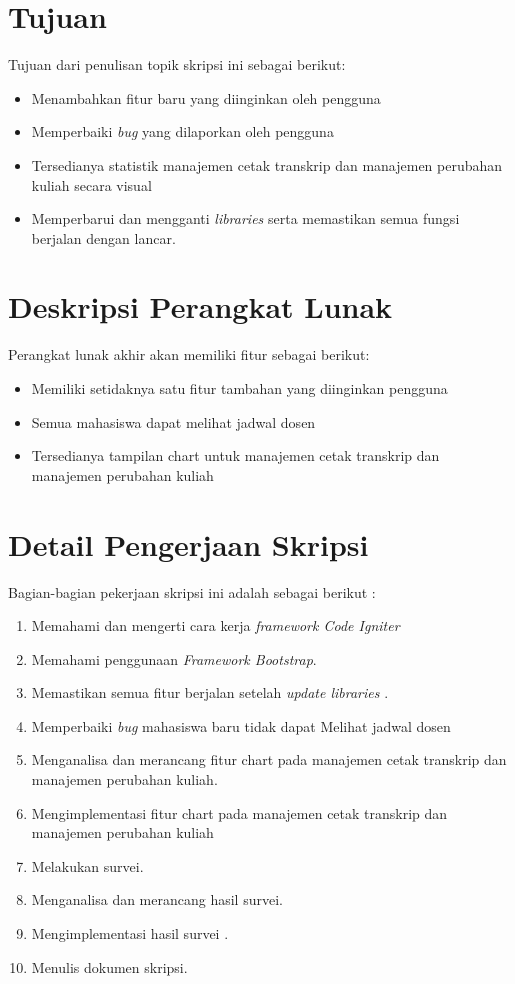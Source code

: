 \documentclass[a4paper,twoside]{article}
\begin{document}
\section{Tujuan}
Tujuan dari penulisan topik skripsi ini sebagai berikut:
\begin{itemize}
	\item Menambahkan fitur baru yang diinginkan oleh pengguna
	\item Memperbaiki \textit{bug} yang dilaporkan oleh pengguna
	\item Tersedianya statistik manajemen cetak transkrip dan manajemen perubahan kuliah secara visual
	\item Memperbarui dan mengganti \textit{libraries} serta memastikan semua fungsi berjalan dengan lancar.
\end{itemize}

\section{Deskripsi Perangkat Lunak}

Perangkat lunak akhir akan memiliki fitur sebagai berikut:
\begin{itemize}
	\item Memiliki setidaknya satu fitur tambahan yang diinginkan pengguna
	\item Semua mahasiswa dapat melihat jadwal dosen
	\item Tersedianya tampilan chart untuk manajemen cetak transkrip dan manajemen perubahan kuliah
	
\end{itemize}

\section{Detail Pengerjaan Skripsi}

Bagian-bagian pekerjaan skripsi ini adalah sebagai berikut :
	\begin{enumerate}
		\item Memahami dan mengerti cara kerja \textit{framework Code Igniter}
		\item Memahami penggunaan \textit{Framework Bootstrap}.
		\item Memastikan semua fitur berjalan setelah \textit{update libraries} .
		\item Memperbaiki \textit{bug} mahasiswa baru tidak dapat Melihat jadwal dosen
		\item Menganalisa dan merancang fitur chart pada manajemen cetak transkrip dan manajemen perubahan kuliah.
		\item Mengimplementasi fitur chart pada manajemen cetak transkrip dan manajemen perubahan kuliah
		\item Melakukan survei.
		\item Menganalisa dan merancang hasil survei.
		\item Mengimplementasi hasil survei	.	
		\item Menulis dokumen skripsi.
	\end{enumerate}
\end{document}
